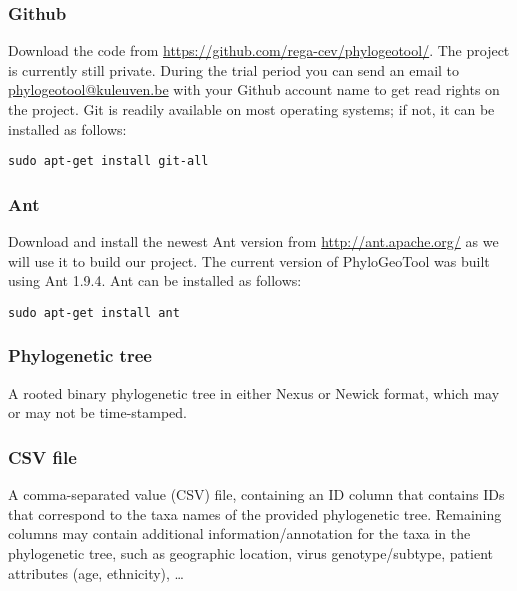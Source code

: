 \documentclass[a4paper, 11pt]{article} %
\begin{document}
\subsubsection*{Github}
Download the code from \url{https://github.com/rega-cev/phylogeotool/}. 
The project is currently still private. 
During the trial period you can send an email to \href{mailto:phylogeotool@kuleuven.be}  {phylogeotool@kuleuven.be} with your Github account name to get read rights on the project.
Git is readily available on most operating systems; if not, it can be installed as follows:
\begin{verbatim}
sudo apt-get install git-all
\end{verbatim}

\subsubsection*{Ant}
Download and install the newest Ant version from \url{http://ant.apache.org/} as we will use it to build our project.
The current version of PhyloGeoTool was built using Ant 1.9.4.
Ant can be installed as follows:
\begin{verbatim}
sudo apt-get install ant
\end{verbatim}

\subsubsection*{Phylogenetic tree}
A rooted binary phylogenetic tree in either Nexus or Newick format, which may or may not be time-stamped.

\subsubsection*{CSV file}
A comma-separated value (CSV) file, containing an ID column that contains IDs that correspond to the taxa names of the provided phylogenetic tree.
Remaining columns may contain additional information/annotation for the taxa in the phylogenetic tree, such as geographic location, virus genotype/subtype, patient attributes (age, ethnicity), \ldots
\end{document}
